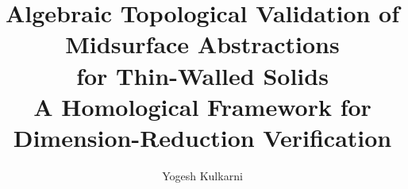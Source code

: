 \documentclass[11pt,a4paper]{article}
\begin{document}
\title{%
  \textbf{Algebraic Topological Validation of Midsurface Abstractions\\
  for Thin-Walled Solids}\\[4pt]
  \large A Homological Framework for Dimension-Reduction Verification
}

\author[1]{Yogesh Kulkarni}

\date{
}

\maketitle
\thispagestyle{empty}
\end{document}
